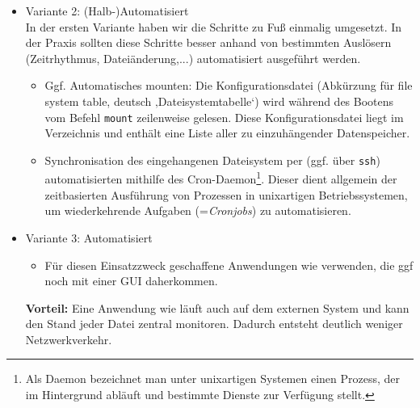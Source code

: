 \begin{itemize}
{\begin{itemize}
\end{itemize}
}
\item Variante 2: (Halb-)Automatisiert\\
In der ersten Variante haben wir die Schritte zu Fuß einmalig umgesetzt. In der Praxis sollten diese Schritte besser anhand von bestimmten Auslösern (Zeitrhythmus, Dateiänderung,...) automatisiert ausgeführt werden.
\begin{itemize}
	\item Ggf. Automatisches mounten: Die Konfigurationsdatei  (Abkürzung für file system table, deutsch ‚Dateisystemtabelle‘) wird während des Bootens vom Befehl \texttt{mount} zeilenweise gelesen. Diese Konfigurationsdatei liegt im Verzeichnis  und enthält eine Liste aller zu einzuhängender Datenspeicher.
	\item Synchronisation des eingehangenen Dateisystem per  (ggf. über \texttt{ssh}) automatisierten mithilfe des Cron-Daemon\footnote{Als Daemon bezeichnet man unter unixartigen Systemen einen Prozess, der im Hintergrund abläuft und bestimmte Dienste zur Verfügung stellt.}. Dieser dient allgemein der zeitbasierten Ausführung von Prozessen in unixartigen Betriebssystemen, um wiederkehrende Aufgaben (=\textit{Cronjobs}) zu automatisieren.
\end{itemize}
\item Variante 3: Automatisiert
\begin{itemize}
	\item Für diesen Einsatzzweck geschaffene Anwendungen wie  verwenden, die ggf noch mit einer GUI daherkommen.
\end{itemize}
\textbf{Vorteil:} Eine Anwendung wie  läuft auch auf dem externen System und kann den Stand jeder Datei zentral monitoren. Dadurch entsteht deutlich weniger Netzwerkverkehr.
\end{itemize}
